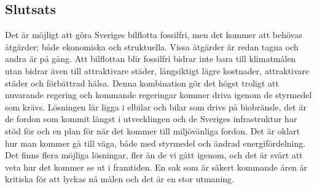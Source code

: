 \documentclass[a4paper,11pt,fleqn, titlepage]{article}
\begin{document}
\subsection{Slutsats}
Det är möjligt att göra Sveriges bilflotta fossilfri, men det kommer att behövas åtgärder; både ekonomiska och struktuella. Vissa åtgärder är redan tagna och andra är på gång. Att bilflottan blir fossilfri bidrar inte bara till klimatmålen utan bidrar även till attraktivare städer, långsiktigt lägre kostnader, attraktivare städer och förbättrad hälsa. Denna kombination gör det högst troligt att nuvarande regering och kommande regeringar kommer driva igenom de styrmedel som krävs. Lösningen lär ligga i elbilar och bilar som drivs på biobränsle, det är de fordon som kommit längst i utvecklingen och de Sveriges infrastruktur har stöd för och en plan för när det kommer till miljövänliga fordon. Det är oklart hur man kommer gå till väga, både med styrmedel och ändrad energifördelning. Det finns flera möjliga lösningar, fler än de vi gått igenom, och det är svårt att veta hur det kommer se ut i framtiden. En sak som är säkert kommande åren är kritiska för att lyckas nå målen och det är en stor utmaning.
\printbibliography
\end{document}
